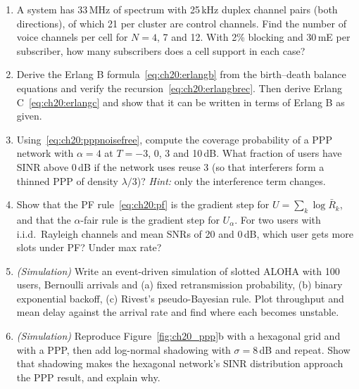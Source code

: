 \begin{enumerate}[label=\thechapter.\arabic*]
of 3, find the smallest $N$ that gives a first-tier SIR of 15\,dB with omnidirectional cells, and with three $120^\circ$ sectors
(two interferers).
\item A system has 33\,MHz of spectrum with 25\,kHz duplex channel pairs (both directions), of which 21 per cluster are control
channels. Find the number of voice channels per cell for $N=4$, 7 and 12. With 2\% blocking and 30\,mE per subscriber, how many
subscribers does a cell support in each case?
\item Derive the Erlang B formula~\eqref{eq:ch20:erlangb} from the birth--death balance equations and verify the
recursion~\eqref{eq:ch20:erlangbrec}. Then derive Erlang C~\eqref{eq:ch20:erlangc} and show that it can be written in terms of
Erlang B as given.
\item Using~\eqref{eq:ch20:pppnoisefree}, compute the coverage probability of a PPP network with $\alpha=4$ at $T=-3$, 0, 3 and
10\,dB. What fraction of users have SINR above 0\,dB if the network uses reuse 3 (so that interferers form a thinned PPP of density
$\lambda/3$)? \emph{Hint:} only the interference term changes.
\item Show that the PF rule~\eqref{eq:ch20:pf} is the gradient step for $U=\sum_k\log\bar R_k$, and that the $\alpha$-fair rule is
the gradient step for $U_\alpha$. For two users with i.i.d.\ Rayleigh channels and mean SNRs of 20 and 0\,dB, which user gets more
slots under PF? Under max rate?
\item \emph{(Simulation)} Write an event-driven simulation of slotted ALOHA with 100 users, Bernoulli arrivals and (a) fixed
retransmission probability, (b) binary exponential backoff, (c) Rivest's pseudo-Bayesian rule. Plot throughput and mean delay
against the arrival rate and find where each becomes unstable.
\item \emph{(Simulation)} Reproduce Figure~\ref{fig:ch20_ppp}b with a hexagonal grid and with a PPP, then add log-normal shadowing
with $\sigma=8$\,dB and repeat. Show that shadowing makes the hexagonal network's SINR distribution approach the PPP result, and
explain why.
\end{enumerate}

